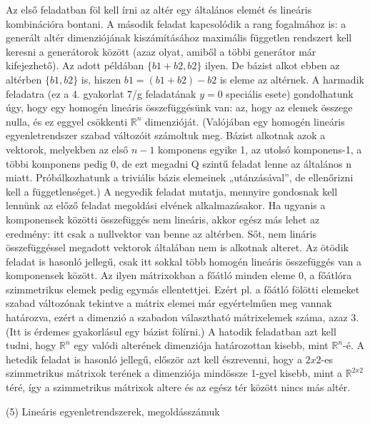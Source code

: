 \begin{frame}
  \begin{tcolorbox}[title={4/7. -Q-}]
Az első feladatban föl kell írni az altér egy általános elemét és lineáris kombinációra bontani. A második feladat kapcsolódik a rang fogalmához is: a generált altér dimenziójának kiszámításához maximális független rendszert kell keresni a generátorok között (azaz olyat, amiből a többi generátor már kifejezhető). Az adott példában $\{b1 + b2,b2\}$ ilyen. De bázist alkot ebben az altérben $\{b1,b2\}$ is, hiszen $b1 = (b1 + b2) - b2$ is eleme az altérnek. A harmadik feladatra (ez a 4. gyakorlat 7/g feladatának $y = 0$ speciális esete) gondolhatunk úgy, hogy egy homogén lineáris összefüggésünk van: az, hogy az elemek összege nulla, és ez eggyel csökkenti $\mathbb{R}^n$ dimenzióját. (Valójában egy homogén lineáris egyenletrendszer szabad változóit számoltuk meg. Bázist alkotnak azok a vektorok, melyekben az első $n-1$ komponens egyike 1, az utolsó komponens-1, a többi komponens pedig 0, de ezt megadni Q szintű feladat lenne az általános n miatt. Próbálkozhatunk a triviális bázis elemeinek „utánzásával”, de ellenőrizni kell a függetlenséget.) A negyedik feladat mutatja, mennyire gondosnak kell lennünk az előző feladat megoldási elvének alkalmazásakor. Ha ugyanis a komponensek közötti összefüggés nem lineáris, akkor egész más lehet az eredmény: itt csak a nullvektor van benne az altérben. Sőt, nem lináris összefüggéssel megadott vektorok általában nem is alkotnak alteret. Az ötödik feladat is hasonló jellegű, csak itt sokkal több homogén lineáris összefüggés van a komponensek között. Az ilyen mátrixokban a főátló minden eleme 0, a főátlóra szimmetrikus elemek pedig egymás ellentettjei. Ezért pl. a főátló fölötti elemeket szabad változónak tekintve a mátrix elemei már egyértelműen meg vannak határozva, ezért a dimenzió a szabadon választható mátrixelemek száma, azaz 3. (Itt is érdemes gyakorlásul egy bázist fölírni.) A hatodik feladatban azt kell tudni, hogy $\mathbb{R}^n$ egy valódi alterének dimenziója határozottan kisebb, mint $\mathbb{R}^n$-é. A hetedik feladat is hasonló jellegű, először azt kell észrevenni, hogy a $2x2$-es szimmetrikus mátrixok terének a dimenziója mindössze 1-gyel kisebb, mint a $\mathbb{R}^{2 x 2}$ téré, így a szimmetrikus mátrixok altere és az egész tér között nincs más altér.
  \end{tcolorbox}
\end{frame}



\begin{frame}[plain]
\begin{tcolorbox}[center, colback={myyellow}, coltext={black}, colframe={myyellow}]
    {\RHuge  (5) Lineáris egyenletrendszerek, megoldásszámuk}
    \mmedskip
\end{tcolorbox}
\end{frame}

